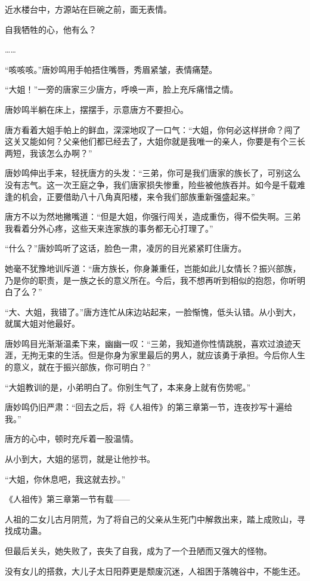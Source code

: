 \begin{this_body}
近水楼台中，方源站在巨碗之前，面无表情。

自我牺牲的心，他有么？

……

“咳咳咳。”唐妙鸣用手帕捂住嘴唇，秀眉紧皱，表情痛楚。

“大姐！”一旁的唐家三少唐方，呼唤一声，脸上充斥痛惜之情。

唐妙鸣半躺在床上，摆摆手，示意唐方不要担心。

唐方看着大姐手帕上的鲜血，深深地叹了一口气：“大姐，你何必这样拼命？闯了这关又能如何？父亲他们都已经去了，大姐你就是我唯一的亲人，你要是有个三长两短，我该怎么办啊？”

唐妙鸣伸出手来，轻抚唐方的头发：“三弟，你可是我们唐家的族长了，可别这么没有志气。这一次王庭之争，我们唐家损失惨重，险些被他族吞并。如今是千载难逢的机会，正要借助八十八角真阳楼，来令我们部族重新强盛起来。”

唐方不以为然地撇嘴道：“但是大姐，你强行闯关，造成重伤，得不偿失啊。三弟我看着分外心疼，这些天来连家族的事务都无心打理了。”

“什么？”唐妙鸣听了这话，脸色一肃，凌厉的目光紧紧盯住唐方。

她毫不犹豫地训斥道：“唐方族长，你身兼重任，岂能如此儿女情长？振兴部族，乃是你的职责，是一族之长的意义所在。今后，我不想再听到相似的抱怨，你听明白了么？”

“大、大姐，我错了。”唐方连忙从床边站起来，一脸惭愧，低头认错。从小到大，就属大姐对他最好。

唐妙鸣目光渐渐温柔下来，幽幽一叹：“三弟，我知道你性情跳脱，喜欢过浪迹天涯，无拘无束的生活。但是你身为家里最后的男人，就应该勇于承担。今后你人生的意义，就在于振兴部族，你可明白？”

“大姐教训的是，小弟明白了。你别生气了，本来身上就有伤势呢。”

唐妙鸣仍旧严肃：“回去之后，将《人祖传》的第三章第一节，连夜抄写十遍给我。”

唐方的心中，顿时充斥着一股温情。

从小到大，大姐的惩罚，就是让他抄书。

“大姐，你休息吧，我这就去抄。”

《人祖传》第三章第一节有载——

人祖的二女儿古月阴荒，为了将自己的父亲从生死门中解救出来，踏上成败山，寻找成功蛊。

但最后关头，她失败了，丧失了自我，成为了一个丑陋而又强大的怪物。

没有女儿的搭救，大儿子太日阳莽更是颓废沉迷，人祖困于落魄谷中，不能生还。


\end{this_body}

